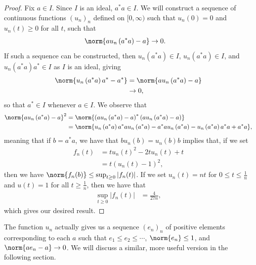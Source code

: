 \documentclass[10pt]{mypackage}
\begin{document}
\begin{proof}
  Fix $a\in I$. Since $I$ is an ideal, $a^{\ast}a\in I$. We will construct a sequence of continuous functions $\left( u_n \right)_n$ defined on $[0,\infty)$ such that $u_n(0) = 0$ and $u_n(t) \geq 0$ for all $t$, such that
  \begin{align*}
    \norm{au_n\left( a^{\ast}a \right) - a} &\rightarrow 0.
  \end{align*}
  If such a sequence can be constructed, then $u_n\left(a^{\ast}a\right)\in I$, $u_n\left(a^{\ast}a\right)\in I$, and $u_n\left( a^{\ast}a \right)a^{\ast}\in I$ as $I$ is an ideal, giving
  \begin{align*}
    \norm{u_n\left( a^{\ast}a \right)a^{\ast} - a^{\ast}} &= \norm{au_n\left( a^{\ast}a \right) - a}\\
                                                          &\rightarrow 0,
  \end{align*}
  so that $a^{\ast}\in I$ whenever $a\in I$. We observe that
  \begin{align*}
    \norm{au_n\left( a^{\ast}a \right) - a}^2 &= \norm{\left( au_n\left( a^{\ast}a \right) - a \right)^{\ast}\left( au_n\left( a^{\ast}a \right) - a \right)}\\
                                              &= \norm{u_n\left( a^{\ast}a \right)a^{\ast}au_n\left( a^{\ast}a \right) - a^{\ast}au_n\left( a^{\ast}a \right) - u_n\left( a^{\ast}a \right)a^{\ast}a + a^{\ast}a},
  \end{align*}
  meaning that if $b = a^{\ast}a$, we have that $bu_n(b) = u_n(b)b$ implies that, if we set
  \begin{align*}
    f_n(t) &= tu_n(t)^2 - 2tu_n(t) + t\\
           &= t\left( u_n(t) - 1 \right)^2,
  \end{align*}
  then we have $\norm{f_n(b)}\leq \sup_{t \geq 0}\left\vert f_n(t) \right\vert$. If we set $u_n(t) = nt$ for $0\leq t \leq \frac{1}{n}$ and $u(t) = 1$ for all $t \geq \frac{1}{n}$, then we have that
  \begin{align*}
    \sup_{t\geq 0} \left\vert f_n(t) \right\vert &= \frac{4}{27n},
  \end{align*}
  which gives our desired result.
\end{proof}
The function $u_n$ actually gives us a sequence $\left( e_n \right)_n$ of positive elements corresponding to each $a$ such that $e_1\leq e_2\leq \cdots$, $\norm{e_n}\leq 1$, and $\norm{ae_n - a}\rightarrow 0$. We will discuss a similar, more useful version in the following section.
\end{document}
